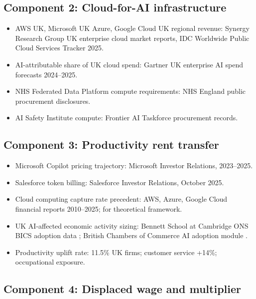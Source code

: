 \documentclass[11pt,letterpaper]{article}
\theoremstyle{remark}
\begin{document}
\subsection{Component 2: Cloud-for-AI infrastructure}

\begin{itemize}
\item AWS UK, Microsoft UK Azure, Google Cloud UK regional revenue: Synergy Research Group UK enterprise cloud market reports, IDC Worldwide Public Cloud Services Tracker 2025.
\item AI-attributable share of UK cloud spend: Gartner UK enterprise AI spend forecasts 2024--2025.
\item NHS Federated Data Platform compute requirements: NHS England public procurement disclosures.
\item AI Safety Institute compute: Frontier AI Taskforce procurement records.
\end{itemize}

\subsection{Component 3: Productivity rent transfer}

\begin{itemize}
\item Microsoft Copilot pricing trajectory: Microsoft Investor Relations, 2023--2025.
\item Salesforce token billing: Salesforce Investor Relations, October 2025.
\item Cloud computing capture rate precedent: AWS, Azure, Google Cloud financial reports 2010--2025; \citet{korinek_vipra_2025} for theoretical framework.
\item UK AI-affected economic activity sizing: Bennett School at Cambridge ONS BICS adoption data \citep{bennett_2024, bennett_2025}; British Chambers of Commerce AI adoption module \citep{bcc_atos_2026}.
\item Productivity uplift rate: \citet{morgan_stanley_2026} 11.5\% UK firms; \citet{brynjolfsson_li_raymond_2025} customer service +14\%; \citet{eloundou_2024} occupational exposure.
\end{itemize}

\subsection{Component 4: Displaced wage and multiplier}
\end{document}
